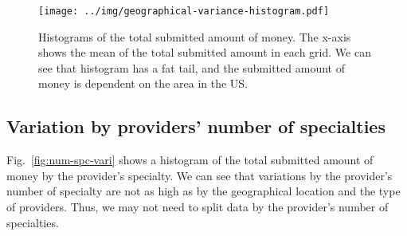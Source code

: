 \documentclass[dvipdfmx, english]{ampmt}             %
\newcommand{\Figref}[1]{Fig.~\ref{#1}}
\begin{document}
\begin{figure}[H]
\centerline{\texttt{[image: ../img/geographical-variance-histogram.pdf]}}
\caption{Histograms of the total submitted amount of money. The x-axis shows the mean of the total submitted amount in each grid. We can see that histogram has a fat tail, and the submitted amount of money is dependent on the area in the US.}
\label{fig:geo-vari-his}
\end{figure}




\subsection*{Variation by providers’{} number of specialties}
\Figref{fig:num-spc-vari} shows a histogram of the total submitted amount of money by the provider’{}s specialty. We can see that variations by the provider’s number of specialty are not as high as by the geographical location and the type of providers. Thus, we may not need to split data by the provider'{}s number of specialties.
\end{document}

